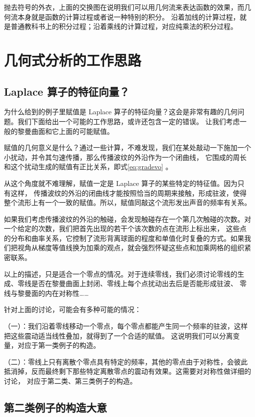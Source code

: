 \documentclass[a4paper,12pt]{article}
\numberwithin{problem}{section}
\numberwithin{definition}{section}
\numberwithin{lemma}{section}
\numberwithin{proposition}{section}
\numberwithin{theorem}{section}
\numberwithin{grammar}{section}
\numberwithin{program}{section}
\numberwithin{convention}{section}
\numberwithin{corollary}{section}
\begin{document}
抛去符号的外衣，上面的交换图在说明我们可以用几何流来表达函数的效果，而几何流本身就是函数的计算过程或者说一种特别的积分。
沿着加线的计算过程，就是普通教科书上的积分过程；沿着乘线的计算过程，对应纯乘法的积分过程。

\newpage
\section{几何式分析的工作思路}

\subsection{Laplace 算子的特征向量？}

为什么给到的例子里赋值是 Laplace 算子的特征向量？这会是非常有趣的几何问题。我们下面给出一个可能的工作思路，或许还包含一定的错误。
让我们考虑一般的黎曼曲面和它上面的可能赋值。

赋值的几何意义是什么？通过一些计算，不难发现，我们在某处敲动一下施加一个小扰动，并令其匀速传播，那么传播波纹的外沿作为一个闭曲线，
它围成的周长和这个扰动生成的赋值有正比关系，即式\ref{eq:gradevo} 。

从这个角度就不难理解，赋值一定是 Laplace 算子的某些特定的特征值。因为只有这样，
传播波纹的外沿的闭曲线才能按照恰当的周期来接触，形成驻波，使得整个流形上有一个一致的赋值。所以，赋值同敲这个流形发出声音的频率有关系。

如果我们考虑传播波纹的外沿的触碰，会发现触碰存在一个第几次触碰的次数。对一个给定的次数，我们把首先出现的若干个该次数的点在流形上标出来，
这些点的分布和曲率关系，它控制了流形背离球面的程度和单值化时复叠的方式。如果我们把视角从梯度等值线换为加乘的观点，就会强烈怀疑这些点和加乘网格的组织紧密联系。

以上的描述，只是适合一个零点的情况。对于连续零线，我们必须讨论零线的生成、零线是否在黎曼曲面上封闭、零线上每个点扰动出去后是否能形成驻波、
零线与黎曼面的内在对称性……

针对上面的讨论，可能会有多种可能的情况：

（一）：我们沿着零线移动一个零点，每个零点都能产生同一个频率的驻波，这样把这些震动适当线性叠加，就得到了一个合适的赋值。
这说明我们可以分离变量，对应于第一类例子的构造。

（二）：零线上只有离散个零点具有特定的频率，其他的零点由于对称性，会彼此抵消掉，反而最终剩下那些特定离散零点的震动有效果。这需要对对称性做详细的讨论，
对应于第二类、第三类例子的构造。

\subsection{第二类例子的构造大意}
\end{document}
